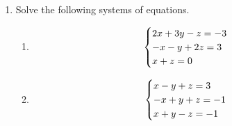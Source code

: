 \documentclass[pdflatex, letterpaper, 12pt]{scrartcl}
\begin{document}
\begin{enumerate}
\item Solve the following systems of equations.
 \begin{enumerate}[label=(\alph*)]
 \item  \begin{eqnarray}
 \begin{cases}
 2x + 3y - z = -3 & \\
 -x - y + 2z = 3 & \\
 x + z = 0 & \notag
 \end{cases}
 \end{eqnarray}
 \item \begin{eqnarray}
 \begin{cases}
 x - y + z = 3 & \\
 -x + y + z = -1 & \\
 x + y - z = -1 & \notag
 \end{cases}
 \end{eqnarray}
 \end{enumerate}


\end{enumerate}
\end{document}
